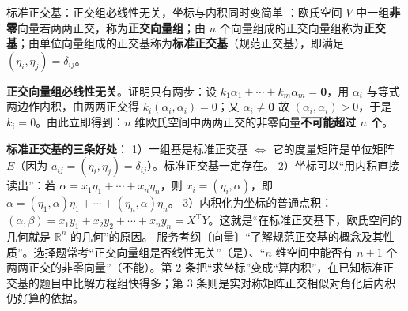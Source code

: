 \begin{fdeep}{标准正交基：正交组必线性无关，坐标与内积同时变简单}
：欧氏空间 $V$ 中一组\textbf{非零}向量若两两正交，称为\textbf{正交向量组}；由 $n$ 个向量组成的正交向量组称为\textbf{正交基}；由单位向量组成的正交基称为\textbf{标准正交基}（规范正交基），即满足 $(\eta_i,\eta_j)=\delta_{ij}$。

\textbf{正交向量组必线性无关}。证明只有两步：设 $k_1\alpha_1+\cdots+k_m\alpha_m=\mathbf{0}$，用 $\alpha_i$ 与等式两边作内积，由两两正交得 $k_i(\alpha_i,\alpha_i)=0$；又 $\alpha_i\ne\mathbf{0}$ 故 $(\alpha_i,\alpha_i)>0$，于是 $k_i=0$。由此立即得到：$n$ 维欧氏空间中两两正交的非零向量\textbf{不可能超过 $n$ 个}。

\textbf{标准正交基的三条好处}：
1）一组基是标准正交基 $\iff$ 它的度量矩阵是单位矩阵 $E$（因为 $a_{ij}=(\eta_i,\eta_j)=\delta_{ij}$）。标准正交基一定存在。
2）坐标可以“用内积直接读出”：若 $\alpha=x_1\eta_1+\cdots+x_n\eta_n$，则 $x_i=(\eta_i,\alpha)$，即 $\alpha=(\eta_1,\alpha)\eta_1+\cdots+(\eta_n,\alpha)\eta_n$。
3）内积化为坐标的普通点积：$(\alpha,\beta)=x_1y_1+x_2y_2+\cdots+x_ny_n=X^{\mathrm T}Y$。这就是“在标准正交基下，欧氏空间的几何就是 $\mathbb{R}^n$ 的几何”的原因。
\fbref{}服务考纲〔向量〕“了解规范正交基的概念及其性质”。选择题常考“正交向量组是否线性无关”（是）、“$n$ 维空间中能否有 $n+1$ 个两两正交的非零向量”（不能）。第 2 条把“求坐标”变成“算内积”，在已知标准正交基的题目中比解方程组快得多；第 3 条则是实对称矩阵正交相似对角化后内积仍好算的依据。
\end{fdeep}

